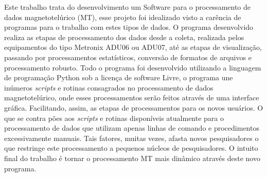 \documentclass[12pt,twoside,oneright,a4paper,chapter=TITLE,english,brazil]{unipampa}
\newcommand{\en}[1]{\textit{#1}}
\begin{document}
\imprimircapa                   %

\imprimirfolhaderosto*          %

\imprimirfichacatalografica     %





    




\begin{resumo}
 Este trabalho trata do desenvolvimento um Software para o processamento de dados magnetotelúrico (MT), esse projeto foi idealizado visto a carência de programas para o trabalho com estes tipos de dados. O programa desenvolvido realiza as etapas de processamento dos dados desde a coleta, realizada pelos equipamentos do tipo Metronix ADU06 ou ADU07, até as etapas de visualização, passando por processamentos estatísticos, conversão de formatos de arquivos e processamento robusto. Todo o programa foi desenvolvido utilizando a linguagem de programação Python sob a licença de software Livre, o programa une inúmeros \en{scripts} e rotinas consagrados no processamento de dados magnetotelúrico, onde esses processamentos serão feitos através de uma interface gráfica. Facilitando, assim, as etapas de processamentos para os novos usuários. O que se contra pões aos \en{scripts} e rotinas disponíveis atualmente para o processamento de dados que utilizam apenas linhas de comando e procedimentos excessivamente manuais. Tais fatores, muitas vezes, afasta novos pesquisadores o que restringe este processamento a pequenos núcleos de pesquisadores. O intuito final do trabalho é tornar o processamento MT mais dinâmico através deste novo programa.
\end{resumo}
\end{document}

